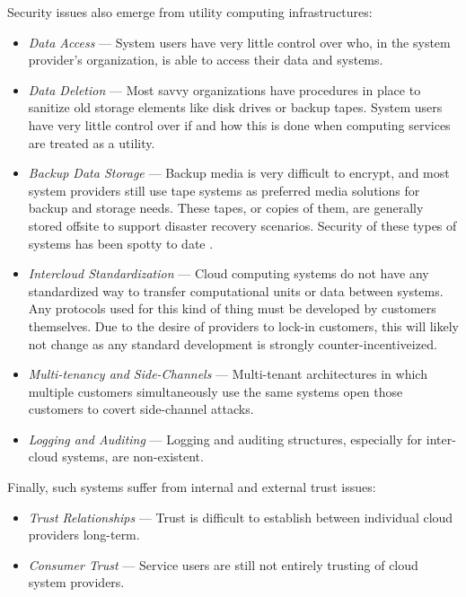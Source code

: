 Security issues also emerge from utility computing infrastructures:
\begin{itemize}
\item \textit{Data Access} --- System users have very little control over who, in the system provider's organization, is able to access their data and systems.
\item \textit{Data Deletion} --- Most savvy organizations have procedures in place to sanitize old storage elements like disk drives or backup tapes.  System users have very little control over if and how this is done when computing services are treated as a utility.
\item \textit{Backup Data Storage} --- Backup media is very difficult to encrypt, and most system providers still use tape systems as preferred media solutions for backup and storage needs.  These tapes, or copies of them, are generally stored offsite to support disaster recovery scenarios.  Security of these types of systems has been spotty to date \cite{proposal:saic-breach-I,proposal:saic-breach-II,proposal:saic-breach-III}.
\item \textit{Intercloud Standardization} --- Cloud computing systems do not have any standardized way to transfer computational units or data between systems.  Any protocols used for this kind of thing must be developed by customers themselves.  Due to the desire of providers to lock-in customers, this will likely not change as any standard development is strongly counter-incentiveized. 
\item \textit{Multi-tenancy and Side-Channels} --- Multi-tenant architectures in which multiple customers simultaneously use the same systems open those customers to covert side-channel attacks.
\item \textit{Logging and Auditing} --- Logging and auditing structures, especially for inter-cloud systems, are non-existent.
\end{itemize}

Finally, such systems suffer from internal and external trust issues:
\begin{itemize}
\item \textit{Trust Relationships} --- Trust is difficult to establish between individual cloud providers long-term.
\item \textit{Consumer Trust} --- Service users are still not entirely trusting of cloud system providers.
\end{itemize}